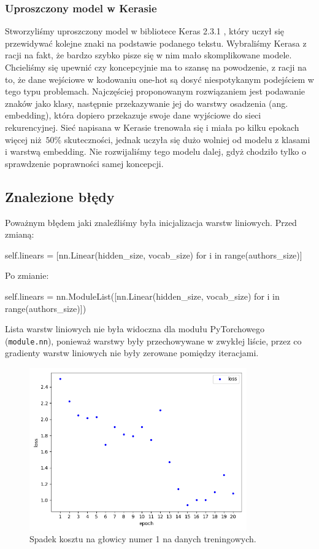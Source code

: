 \subsubsection{Uproszczony model w Kerasie}
Stworzyliśmy uproszczony model w bibliotece Keras 2.3.1 \cite{keras}, który uczył się przewidywać kolejne znaki na podstawie podanego tekstu.
Wybraliśmy Kerasa z racji na fakt, że bardzo szybko pisze się w nim mało skomplikowane modele.
Chcieliśmy się upewnić czy koncepcyjnie ma to szansę na powodzenie, z racji na to, że dane wejściowe w kodowaniu one-hot
są dosyć niespotykanym podejściem w tego typu problemach. Najczęściej proponowanym rozwiązaniem jest podawanie znaków jako klasy, następnie
przekazywanie jej do warstwy osadzenia (ang. embedding), która dopiero przekazuje swoje dane wyjściowe do sieci rekurencyjnej.
Sieć napisana w Kerasie trenowała się i miała po kilku epokach więcej niż $50\%$ skuteczności, jednak uczyła się
dużo wolniej od modelu z klasami i warstwą embedding. Nie rozwijaliśmy tego modelu dalej, gdyż chodziło tylko o sprawdzenie poprawności samej koncepcji.

\newpage
\subsection{Znalezione błędy}
Poważnym błędem jaki znaleźliśmy była inicjalizacja warstw liniowych.
Przed zmianą:
\begin{python}
self.linears = [nn.Linear(hidden_size, vocab_size) for i in range(authors_size)]

\end{python}
Po zmianie:
\begin{python}
self.linears = nn.ModuleList([nn.Linear(hidden_size, vocab_size) for i in range(authors_size)])

\end{python}

Lista warstw liniowych nie była widoczna dla modułu PyTorchowego (\texttt{module.nn}), ponieważ warstwy były przechowywane
w zwykłej liście, przez co gradienty warstw liniowych nie były zerowane pomiędzy iteracjami.

\begin{figure}[H]
	\centering
	\includegraphics[height=7cm]{./images/loss_decrease.png}
	\caption{Spadek kosztu na głowicy numer 1 na danych treningowych.}
	\label{fig:test5}
\end{figure}

